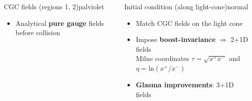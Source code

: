 \documentclass[aspectratio=169,11pt,usenames,dvipsnames]{beamer}
\begin{document}
\begin{frame}
\begin{columns}[onlytextwidth,t]
        \begin{custombox2}{{\normalsize CGC fields} {\tiny (regions 1, 2)}}{palviolet}
            \small
            \begin{varwidth}{0.93\textwidth}
            \begin{itemize}\itemsep0em 
                \footnotesize
                \item Analytical {\color{red}\bfseries pure gauge} fields before collision
            \end{itemize}
            \end{varwidth}
        \end{custombox2}

        \begin{custombox2}{{\normalsize Initial condition} {\tiny (along light-cone)}}{normal}
            \small
            \begin{varwidth}{0.93\textwidth}
            \begin{itemize}\itemsep0em 
                \footnotesize
                \item Match CGC fields on the light cone
                \item Impose {\bfseries boost-invariance} $\Rightarrow$ 2+1D fields\\
                {\tiny\color{lightgray} Milne coordinates {\color{Blue}$\tau=\sqrt{x^+x^-}$} and {\color{ForestGreen}$\eta=\mathrm{ln}(x^+/x^-)$}}
                \footnotesize
                \item {\bfseries\color{jyured}Glasma improvements}: 3+1D fields
            \end{itemize}
            \end{varwidth}
        \end{custombox2}


\end{columns}
\end{frame}
\end{document}
